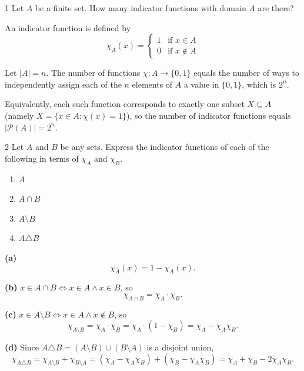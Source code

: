 
\begin{exercise}{1}
    Let $A$ be a finite set. How many indicator functions with domain $A$ are
    there?
\end{exercise}
\begin{solbox}
\begin{solution}
    An indicator function is defined by
    \[
        \chi_A(x) = \begin{cases} 1 & \text{if } x\in A \\
            0 & \text{if } x\notin A \end{cases}
    \]

    Let $|A|=n$. The number of functions $\chi: A\to\{0,1\}$ equals
    the number of ways to independently assign each of the $n$
    elements of $A$ a value in $\{0,1\}$, which is $2^n$.

    Equivalently, each such function corresponds to exactly one
    subset $X\subseteq A$ (namely $X=\{x\in A : \chi(x)=1\}$), so the
    number of indicator functions equals $|\mathcal P(A)| = 2^n$.
\end{solution}
\end{solbox}

\begin{exercise}{2}
    Let $A$ and $B$ be any sets. Express the indicator functions of each of the
    following in terms of $\chi_A$ and $\chi_B$.
    \begin{enumerate}[label=(\alph*)]
        \item $\overline A$
        \item $A\cap B$
        \item $A\setminus B$
        \item $A\triangle B$
    \end{enumerate}
\end{exercise}
\begin{solbox}
\begin{solution}
    \textbf{(a)}
    \[
        \chi_{\overline A}(x) = 1-\chi_A(x).
    \]

    \textbf{(b)} $x\in A\cap B \iff x\in A \wedge x\in B$, so
    \[
        \chi_{A\cap B} = \chi_A\cdot\chi_B.
    \]

    \textbf{(c)} $x\in A\setminus B \iff x\in A \wedge x\notin B$, so
    \[
        \chi_{A\setminus B} = \chi_A\cdot\chi_{\overline B}
        = \chi_A\cdot(1-\chi_B) = \chi_A - \chi_A\chi_B.
    \]

    \textbf{(d)} Since $A\triangle B = (A\setminus B)\cup(B\setminus
    A)$ is a disjoint union,
    \[
        \chi_{A\triangle B} = \chi_{A\setminus B}+\chi_{B\setminus A}
        = (\chi_A-\chi_A\chi_B)+(\chi_B-\chi_A\chi_B)
        = \chi_A+\chi_B-2\chi_A\chi_B.
    \]
\end{solution}
\end{solbox}

